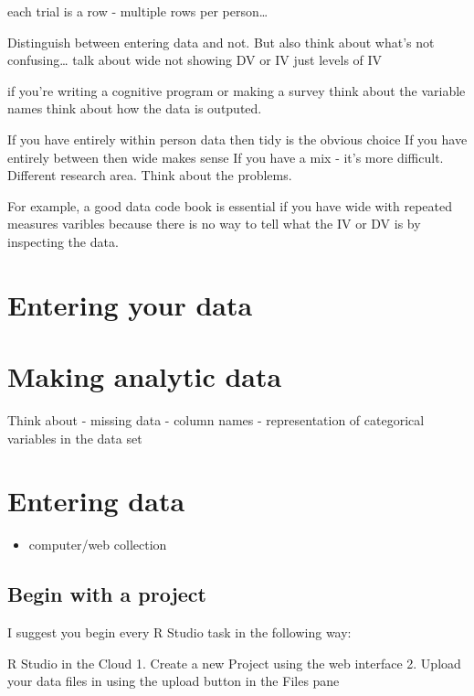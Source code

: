 \documentclass[
]{krantz}
\providecommand{\tightlist}{%
  \setlength{\itemsep}{0pt}\setlength{\parskip}{0pt}}
\begin{document}
each trial is a row - multiple rows per person\ldots{}

Distinguish between entering data and not. But also think about what's not confusing\ldots{}
talk about wide not showing DV or IV just levels of IV

if you're writing a cognitive program or making a survey think about the variable names
think about how the data is outputed.

If you have entirely within person data then tidy is the obvious choice
If you have entirely between then wide makes sense
If you have a mix - it's more difficult. Different research area. Think about the problems.

For example, a good data code book is essential if you have wide with repeated measures varibles because there is no way to tell what the IV or DV is by inspecting the data.

\hypertarget{entering-your-data}{%
\chapter{Entering your data}\label{entering-your-data}}

\hypertarget{making-analytic-data}{%
\chapter{Making analytic data}\label{making-analytic-data}}

Think about
- missing data
- column names
- representation of categorical variables in the data set

\hypertarget{entering-data}{%
\chapter{Entering data}\label{entering-data}}

\begin{itemize}
\tightlist
\item
  computer/web collection
\end{itemize}

\hypertarget{begin-with-a-project}{%
\section{Begin with a project}\label{begin-with-a-project}}

I suggest you begin every R Studio task in the following way:

R Studio in the Cloud
1. Create a new Project using the web interface
2. Upload your data files in using the upload button in the Files pane
\end{document}
